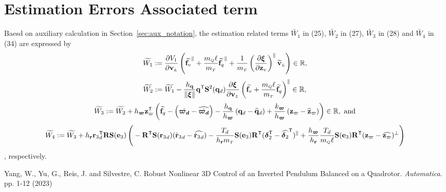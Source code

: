 \documentclass[journal,onecolumn]{IEEEtran}
\begin{document}
\section{Estimation Errors Associated term}

Baesd on auxiliary calculation in Section~\ref{sec:aux_notation}, the estimation related terms $\widetilde{W_1}$ in (25),  $\widetilde{W_2}$ in (27), $\widetilde{W_3}$ in (28) and $\widetilde{W_4}$ in (34) are expressed by
%
\begin{equation}
	\widetilde{W_1}:=\frac{\partial V_1}{\partial \vL}\LP\widetilde{\f_v}^{\|} + \frac{\mQ\ellp}{\mT}\widetilde{\f_q}^{\|} + \frac{1}{\mT}\LP\frac{\partial\Xiq}{\partial\zv}\RP^{\|}\vLtilde\RP \in \mathbb{R},
\end{equation}
%
%
\begin{align}
	\widetilde{W_2} := \widetilde{W_1} - \frac{h_\v{q}}{\|\Xiq\|}\dir[T]\Skew[2]{\dird}  \frac{\partial \Xiq}{\partial \vL}\LP\widetilde{\f_v} 
	+ \frac{\mQ\ellp}{\mT}\widetilde{\f_q} \RP^{\|}\in\mathbb{R},
\end{align}
%
\begin{align}
	\widetilde{W_3} := \widetilde{W_2} + h_{\bs\varpi}\zc[T]\LP\widetilde{\f_q} - \LP\dot{\bs{\varpi_d}} - \widehat{\dot{\bs{\varpi_d}}}\RP -  \frac{h_\v{q}}{h_{\bs{\varpi}}}\LP\dird-\qdhat
	\RP + \frac{k_{\bs{\varpi}}}{h_{\bs{\varpi}}}\LP\zc-\zchat\RP\RP\in\mathbb{R},~\text{and}
\end{align}
%
\begin{align}
	\widetilde{W_4}:=\widetilde{W_3} + h_\v{r}\rzd\trs \RotM\Skew{\ez}\LP
	\vphantom{\LP\frac{\partial V_4}{\partial\vL}\dir\RP\trs}
	-\RotM[T]\Skew{\rzd}(\rzddot-\widehat{\rzddot})
	-\frac{T_d}{h_\v{r}\mT}\Skew{\ez}\RotM[T](\bs{\delta}_2\trs-\widehat{\bs{\delta}_2}\trs)^{\|}
	+\frac{h_{\bs\varpi}}{h_\v{r}}\frac{T_d}{\mQ\ellp}\Skew{\ez}\RotM[T](\zc-\widehat{\zc})^{\perp}\RP
\end{align}
%
, respectively.
\begin{thebibliography}{9}
Yang, W., Yu, G., Reis, J. and Silvestre, C. Robust Nonlinear 3D Control of an Inverted Pendulum Balanced on a Quadrotor. {\em Automatica}. pp. 1-12 (2023)
\end{thebibliography}
\end{document}
